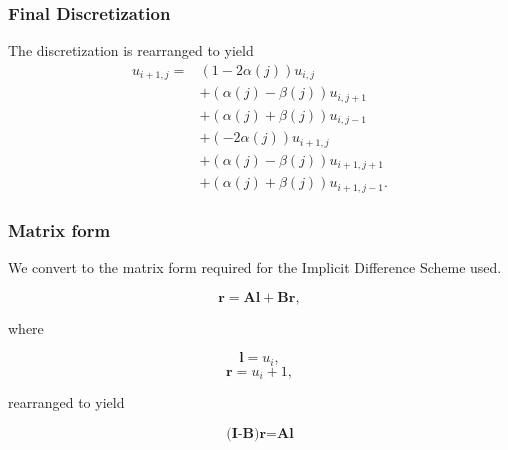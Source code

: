 \documentclass{beamer}
\begin{document}
  \begin{frame}
    \frametitle{Final Discretization}
    The discretization is rearranged to yield
    \begin{equation}
      \begin{split}
        u_{i+1, j} = & (1-2\alpha(j))u_{i, j} \\
        & + (\alpha(j)-\beta(j))u_{i, j+1}\\
        & + (\alpha(j)+\beta(j))u_{i, j-1}\\
        & + (-2\alpha(j))u_{i+1, j}\\
        & + (\alpha(j)-\beta(j))u_{i+1, j+1}\\
        & + (\alpha(j)+\beta(j))u_{i+1, j-1}.
      \end{split}
    \end{equation}
  \end{frame}

  \begin{frame}
    \frametitle{Matrix form}
    We convert to the matrix form required for the Implicit Difference Scheme used.

    \begin{equation}
      \textbf{r} = \textbf{Al} + \textbf{Br},
    \end{equation}

    where

    \begin{equation}
      \textbf{l} = u_{i},
    \end{equation}
    \begin{equation}
      \textbf{r} = u_i+1,
    \end{equation}

    rearranged to yield

    \begin{equation}
      \textbf{(I-B)}\textbf{r} = \textbf{Al}
    \end{equation}

  \end{frame}
\end{document}
